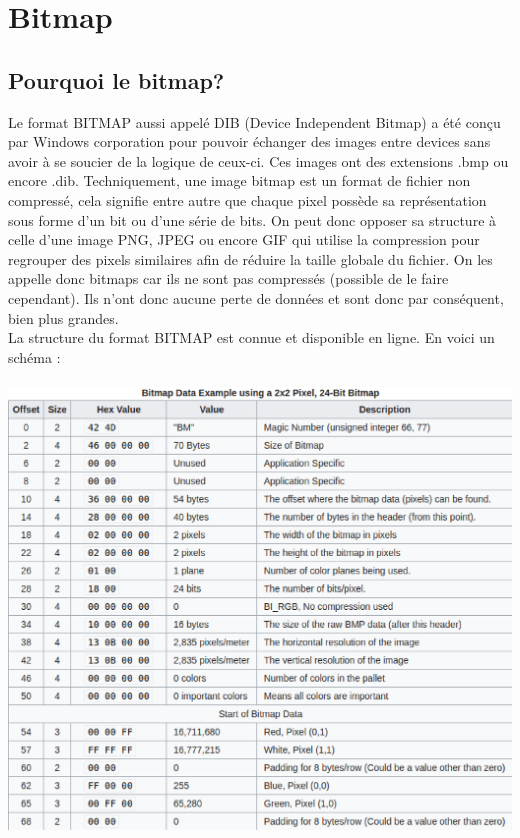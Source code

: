 \section {Bitmap}

\subsection {Pourquoi le bitmap?}
Le format BITMAP aussi appelé DIB (Device Independent Bitmap) a été conçu par Windows corporation pour pouvoir échanger des images entre devices sans avoir à se soucier de la logique de ceux-ci.
Ces images ont des extensions .bmp ou encore .dib.
Techniquement, une image bitmap est un format de fichier non compressé, cela signifie entre autre que chaque pixel possède sa représentation sous forme d'un bit ou d'une série de bits.
On peut donc opposer sa structure à celle d'une image PNG, JPEG ou encore GIF qui utilise la compression pour regrouper des pixels similaires afin de réduire la taille globale du fichier.
On les appelle donc bitmaps car ils ne sont pas compressés (possible de le faire cependant).
Ils n'ont donc aucune perte de données et sont donc par conséquent, bien plus grandes.\\

La structure du format BITMAP est connue et disponible en ligne. En voici un schéma : \\\\

\includegraphics[width=15cm]{bitmap_structure.eps}\\\\

